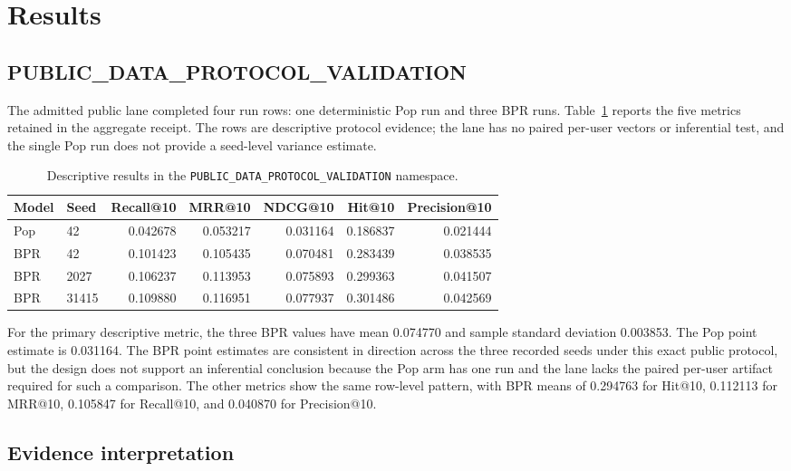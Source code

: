 \documentclass[10pt,a4paper]{article}
\begin{document}
\section{Results}

\subsection{PUBLIC\_DATA\_PROTOCOL\_VALIDATION}

The admitted public lane completed four run rows: one deterministic Pop run and
three BPR runs. Table~\ref{tab:public-validation} reports the five metrics
retained in the aggregate receipt. The rows are descriptive protocol evidence;
the lane has no paired per-user vectors or inferential test, and the single Pop
run does not provide a seed-level variance estimate.

\begin{table}[htbp]
\centering
\caption{Descriptive results in the \texttt{PUBLIC\_DATA\_PROTOCOL\_VALIDATION} namespace.}
\label{tab:public-validation}
\small
\begin{tabular}{llrrrrr}
\toprule
Model & Seed & Recall@10 & MRR@10 & NDCG@10 & Hit@10 & Precision@10 \\
\midrule
Pop & 42 & 0.042678 & 0.053217 & 0.031164 & 0.186837 & 0.021444 \\
BPR & 42 & 0.101423 & 0.105435 & 0.070481 & 0.283439 & 0.038535 \\
BPR & 2027 & 0.106237 & 0.113953 & 0.075893 & 0.299363 & 0.041507 \\
BPR & 31415 & 0.109880 & 0.116951 & 0.077937 & 0.301486 & 0.042569 \\
\bottomrule
\end{tabular}
\end{table}

For the primary descriptive metric, the three BPR values have mean 0.074770
and sample standard deviation 0.003853. The Pop point estimate is 0.031164.
The BPR point estimates are consistent in direction across the three recorded
seeds under this exact public protocol, but the design does not support an
inferential conclusion because the Pop arm has one run and the lane lacks the
paired per-user artifact required for such a comparison. The other metrics show
the same row-level pattern, with BPR means of 0.294763 for Hit@10, 0.112113 for
MRR@10, 0.105847 for Recall@10, and 0.040870 for Precision@10.

\subsection{Evidence interpretation}
\end{document}
